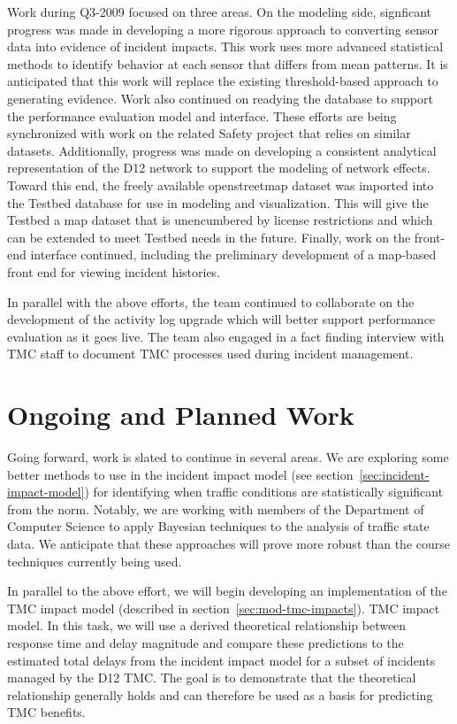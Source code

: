 Work during Q3-2009 focused on three areas.  On the modeling side, signficant
progress was made in developing a more rigorous approach to converting sensor
data into evidence of incident impacts.  This work uses more advanced
statistical methods to identify behavior at each sensor that differs from mean
patterns.  It is anticipated that this work will replace the existing
threshold-based approach to generating evidence.  Work also continued on
readying the database to support the performance evaluation model and interface.
These efforts are being synchronized with work on the related Safety project
that relies on similar datasets.  Additionally, progress was made on developing
a consistent analytical representation of the D12 network to support the
modeling of network effects.  Toward this end, the freely available
openstreetmap dataset was imported into the Testbed database for use in modeling
and visualization.  This will give the Testbed a map dataset that is
unencumbered by license restrictions and which can be extended to meet Testbed
needs in the future.  Finally, work on the front-end interface continued,
including the preliminary development of a map-based front end for viewing
incident histories.

In parallel with the above efforts, the team continued to collaborate on the
development of the activity log upgrade which will better support performance
evaluation as it goes live.  The team also engaged in a fact finding interview
with TMC staff to document TMC processes used during incident management.


\section*{Ongoing and Planned Work}
\label{execsum-ongoing-work}

Going forward, work is slated to continue in several areas.  We are exploring
some better methods to use in the incident impact model
%
\iffull
(see section~\ref{sec:incident-impact-model})
\fi
%
for identifying when traffic conditions are statistically significant from the
norm.  Notably, we are working with members of the Department of Computer
Science to apply Bayesian techniques to the analysis of traffic state data.  We
anticipate that these approaches will prove more robust than the course
techniques currently being used.

In parallel to the above effort, we will begin developing an implementation of
the
\iffull%
TMC impact model (described in section~\ref{sec:mod-tmc-impacts}).%
\else%
TMC impact model.%
\fi
%
In this task, we will use a derived theoretical relationship between response
time and delay magnitude and compare these predictions to the estimated total
delays from the incident impact model for a subset of incidents managed by the
D12 TMC.  The goal is to demonstrate that the theoretical relationship generally
holds and can therefore be used as a basis for predicting TMC benefits.

